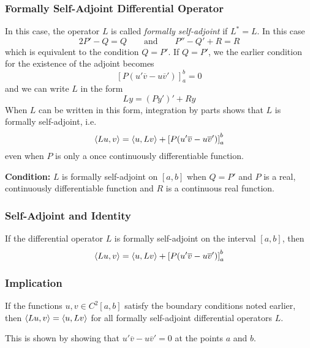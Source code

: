 \documentclass[11pt, a4paper]{article}
\begin{document}
\subsubsection{Formally Self-Adjoint Differential Operator}
In this case, the operator $ L $ is called \textit{formally self-adjoint} if $ L^* = L $. In this case
\begin{equation*}
	2P' - Q = Q \qquad \text{and} \qquad P'' - Q' + R = R
\end{equation*}
which is equivalent to the condition $ Q = P' $.  If $ Q = P' $, we the earlier condition for the existence of the adjoint becomes
\begin{equation*}
	\left[P(u'\overline{v} - u \overline{v}') \right]_{a}^{b} = 0
\end{equation*}
and we can write $ L $ in the form
\begin{equation*}
	Ly = (Py')' + Ry
\end{equation*}
When $ L $ can be written in this form, integration by parts shows that $ L $ is formally self-adjoint, i.e.
\begin{equation*}
	\expval{Lu, v} = \expval{u, Lv} + \left[P(u'\overline{v} - u \overline{v}') \right]_{a}^{b}
\end{equation*}
even when $ P $ is only a once continuously differentiable function.

\textbf{Condition:} $ L $ is formally self-adjoint on $ [a, b] $ when $ Q = P' $ and $ P $ is a real, continuously differentiable function and $ R $ is a continuous real function.

\subsubsection{Self-Adjoint and Identity}
If the differential operator $ L $ is formally self-adjoint on the interval $ [a, b] $, then
\begin{equation*}
	\expval{Lu, v} = \expval{u, Lv} + \left[P(u'\overline{v} - u \overline{v}') \right]_{a}^{b}
\end{equation*}

\subsubsection{Implication}
If the functions $ u, v \in C^2[a, b] $ satisfy the boundary conditions noted earlier, then $ \expval{Lu, v} = \expval{u, Lv} $ for all formally self-adjoint differential operators $ L $.

This is shown by showing that $ u'\overline{v} - u \overline{v}' = 0 $ at the points $ a $ and $ b $.
\end{document}
